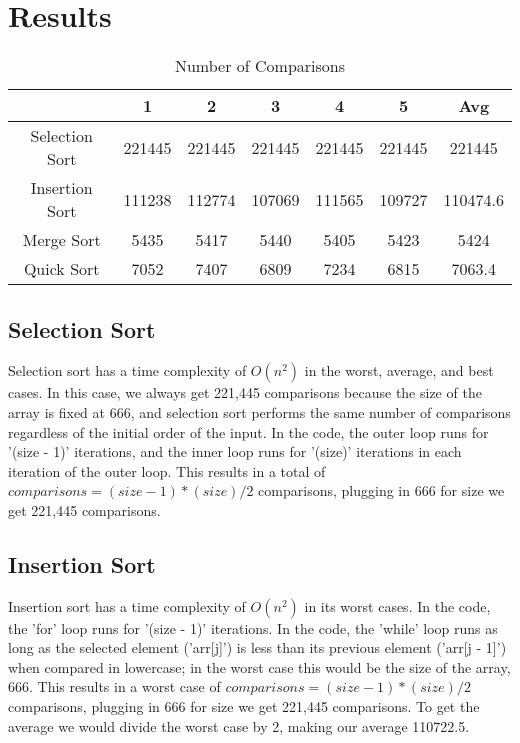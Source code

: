 \documentclass[letterpaper, 10pt,DIV=13]{scrartcl}
\numberwithin{equation}{section} %
\numberwithin{figure}{section} %
\numberwithin{table}{section} %
\begin{document}
\section{Results}

\begin{table}[H]
\centering
\caption{Number of Comparisons}
\begin{tabular}{|c|c|c|c|c|c|c|}
\hline
 & 1 & 2 & 3 & 4 & 5 & Avg \\
\hline
Selection Sort & 221445 & 221445 & 221445 & 221445 & 221445 & 221445 \\
\hline
Insertion Sort & 111238 & 112774 & 107069 & 111565 & 109727 & 110474.6 \\
\hline
Merge Sort & 5435 & 5417 & 5440 & 5405 & 5423 & 5424 \\
\hline
Quick Sort & 7052 & 7407 & 6809 & 7234 & 6815 & 7063.4 \\
\hline
\end{tabular}
\end{table}

\subsection{Selection Sort}
Selection sort has a time complexity of $O(n^2)$ in the worst, average, and best cases. In this case, we always get 221,445 comparisons because the size of the array is fixed at 666, and selection sort performs the same number of comparisons regardless of the initial order of the input. In the code, the outer loop runs for '(size - 1)' iterations, and the inner loop runs for '(size)' iterations in each iteration of the outer loop. This results in a total of $comparisons = (size - 1) * (size) / 2$ comparisons, plugging in 666 for size we get 221,445 comparisons.
\subsection{Insertion Sort} 
Insertion sort has a time complexity of $O(n^2)$ in its worst cases. In the code, the 'for' loop runs for '(size - 1)' iterations. In the code, the 'while' loop runs as long as the selected element ('arr[j]') is less than its previous element ('arr[j - 1]') when compared in lowercase; in the worst case this would be the size of the array, 666. This results in a worst case of $comparisons = (size - 1) * (size) / 2$ comparisons,  plugging in 666 for size we get 221,445 comparisons. To get the average we would divide the worst case by 2, making our average 110722.5.
\end{document}
